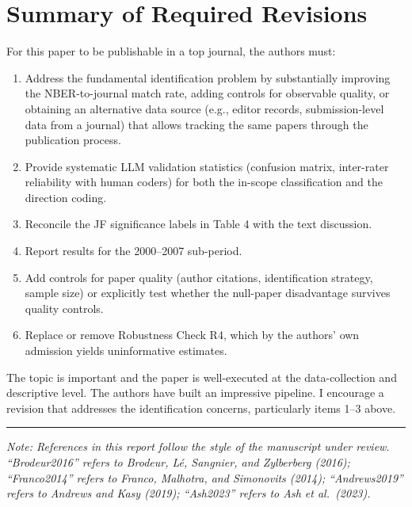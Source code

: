 \documentclass[12pt]{article}
\begin{document}
\section*{Summary of Required Revisions}

For this paper to be publishable in a top journal, the authors must:

\begin{enumerate}
  \item Address the fundamental identification problem by substantially
        improving the NBER-to-journal match rate, adding controls for
        observable quality, or obtaining an alternative data source (e.g.,
        editor records, submission-level data from a journal) that allows
        tracking the same papers through the publication process.
  \item Provide systematic LLM validation statistics (confusion matrix,
        inter-rater reliability with human coders) for both the in-scope
        classification and the direction coding.
  \item Reconcile the JF significance labels in Table 4 with the text
        discussion.
  \item Report results for the 2000--2007 sub-period.
  \item Add controls for paper quality (author citations, identification
        strategy, sample size) or explicitly test whether the null-paper
        disadvantage survives quality controls.
  \item Replace or remove Robustness Check R4, which by the authors' own
        admission yields uninformative estimates.
\end{enumerate}

The topic is important and the paper is well-executed at the data-collection
and descriptive level.  The authors have built an impressive pipeline.
I encourage a revision that addresses the identification concerns, particularly
items 1--3 above.

\bigskip
\noindent\rule{\linewidth}{0.4pt}

\noindent\textit{Note: References in this report follow the style of the
manuscript under review.  ``Brodeur2016'' refers to Brodeur, L\'{e}, Sangnier,
and Zylberberg (2016); ``Franco2014'' refers to Franco, Malhotra, and
Simonovits (2014); ``Andrews2019'' refers to Andrews and Kasy (2019);
``Ash2023'' refers to Ash et al.\ (2023).}
\end{document}
